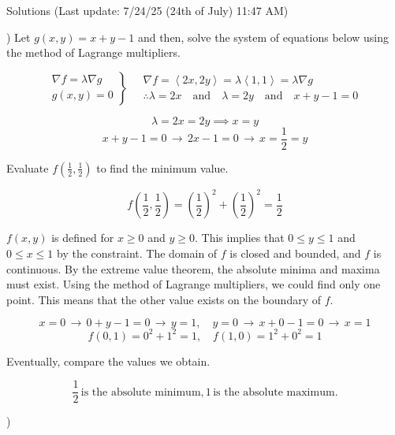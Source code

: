 \documentclass{article}
\begin{document}
\newpage

\begin{center}
Solutions (Last update: 7/24/25 (24th of July) 11:47 AM)
\end{center}

) Let $g(x,y)=x+y-1$ and then, solve the system of equations below using the method of Lagrange multipliers.

\[
\left.
\begin{array}{ll}
\displaystyle\nabla f =\lambda \nabla g \\
\displaystyle g(x,y) = 0
\end{array}
\right\}\quad
\begin{array}{ll}
\nabla f = \left\langle 2x, 2y\right\rangle = \lambda\left\langle1,1\right\rangle = \lambda\nabla g\\\therefore\displaystyle \lambda = 2x\quad \text{and}\quad \lambda = 2y\quad \text{and}\quad x+y-1=0
\end{array}
\]

\[\lambda=2x=2y\implies x=y\]
\[x+y-1=0 \,\rightarrow\, 2x-1 = 0\,\rightarrow\,x=\frac12=y\]

\hfill

\noindent Evaluate $\displaystyle f\left(\frac12,\frac12\right)$ to find the minimum value.

\[f\left(\frac12,\frac12\right)=\left(\frac12\right)^2+\left(\frac12\right)^2=\frac12\]

\hfill

\noindent $f(x,y)$ is defined for $x\geq0$ and $y\geq0$. This implies that $0\leq y \leq1$ and $0\leq x\leq1$ by the constraint. The domain of $f$ is closed and bounded, and $f$ is continuous. By the extreme value theorem, the absolute minima and maxima must exist. Using the method of Lagrange multipliers, we could find only one point. This means that the other value exists on the boundary of $f$.

\[x=0\,\rightarrow\,0+y-1=0\,\rightarrow\,y=1,\quad y=0\,\rightarrow\, x+0-1=0\,\rightarrow\, x=1\]
\[f(0,1) = 0^2 +1^2 = 1,\quad f(1,0) = 1^2+0^2 = 1\]

\hfill

\noindent Eventually, compare the values we obtain.

\[\boxed{\frac12\,\text{is the absolute minimum}, 1\,\text{is the absolute maximum}.}\]

\hfill

)
\end{document}
